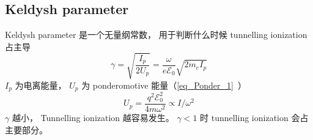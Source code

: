 
\begin{issues}
\issueDraft
\end{issues}


\subsection{Keldysh parameter}
Keldysh parameter 是一个无量纲常数， 用于判断什么时候 tunnelling ionization 占主导
\begin{equation}
\gamma = \sqrt{\frac{I_p}{2U_p}} = \frac{\omega}{e\mathcal E_0} \sqrt{2m_e I_p}
\end{equation}
$I_p$ 为电离能量， $U_p$ 为 ponderomotive 能量（\autoref{eq_Ponder_1}~）
\begin{equation}
U_p = \frac{q^2 \mathcal E_0^2}{4m\omega^2} \propto I/\omega^2
\end{equation}
$\gamma$ 越小， Tunnelling ionization 越容易发生。 $\gamma < 1$ 时 tunnelling ionization 会占主要部分。
